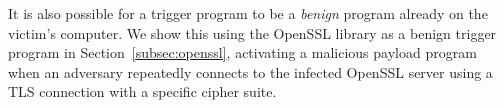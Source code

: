 %
%








It is also possible for a trigger program to be a
\emph{benign} program already on the victim's computer. We
show this using the OpenSSL library as a benign trigger
program in Section~\ref{subsec:openssl}, activating a malicious payload program
when an adversary repeatedly connects to the infected OpenSSL server using a
TLS connection with a specific cipher suite.


